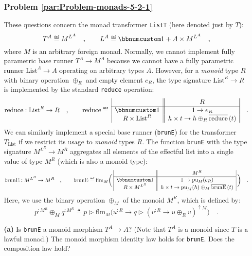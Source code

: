 \subsubsection{Problem \label{par:Problem-monads-5-2-1}\ref{par:Problem-monads-5-2-1}}

These questions concern the monad transformer \lstinline!ListT! (here
denoted just by $T$): 
\[
T^{A}\triangleq M^{L^{A}}\quad,\quad\quad L^{A}\triangleq\bbnum 1+A\times M^{L^{A}}\quad,
\]
where $M$ is an arbitrary foreign monad. Normally, we cannot implement
fully parametric base runner $T^{A}\rightarrow M^{A}$ because we
cannot have a fully parametric runner $\text{List}^{A}\rightarrow A$
operating on arbitrary types $A$. However, for a \emph{monoid} type
$R$ with binary operation $\oplus_{R}$ and empty element $e_{R}$,
the type signature $\text{List}^{R}\rightarrow R$ is implemented
by the standard \lstinline!reduce! operation: 
\[
\text{reduce}:\text{List}^{R}\rightarrow R\quad,\quad\quad\text{reduce}\triangleq\,\begin{array}{|c||c|}
 & R\\
\hline \bbnum 1 & 1\rightarrow e_{R}\\
R\times\text{List}^{R} & h\times t\rightarrow h\oplus_{R}\overline{\text{reduce}}\,(t)
\end{array}\quad.
\]
We can similarly implement a special base runner (\lstinline!brunE!)
for the transformer $T_{\text{List}}$ if we restrict its usage to
\emph{monoid} types $R$. The function \lstinline!brunE! with the
type signature $M^{L^{R}}\rightarrow M^{R}$ aggregates all elements
of the effectful list into a single value of type $M^{R}$ (which
is also a monoid type):
\[
\text{brunE}:M^{L^{R}}\rightarrow M^{R}\quad,\quad\quad\text{brunE}\triangleq\text{flm}_{M}\bigg(\,\begin{array}{|c||c|}
 & M^{R}\\
\hline \bbnum 1 & 1\rightarrow\text{pu}_{M}(e_{R})\\
R\times M^{L^{R}} & h\times t\rightarrow\text{pu}_{M}(h)\oplus_{M}\overline{\text{brunE}}\,(t)
\end{array}\,\bigg)\quad.
\]
Here, we use the binary operation $\oplus_{M}$ of the monoid $M^{R}$,
which is defined by:
\[
p^{:M^{R}}\oplus_{M}q^{:M^{R}}\triangleq p\triangleright\text{flm}_{M}\big(u^{:R}\rightarrow q\triangleright(v^{:R}\rightarrow u\oplus_{R}v)^{\uparrow M}\big)\quad.
\]

\textbf{(a)} Is \lstinline!brunE! a monoid morphism $T^{A}\rightarrow A$?
(Note that $T^{A}$ is a monoid since $T$ is a lawful monad.) The
monoid morphism identity law holds for \lstinline!brunE!. Does the
composition law hold?

